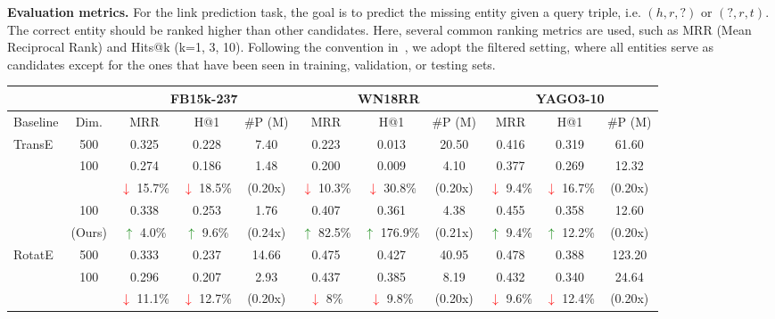 \documentclass{article}
\begin{document}
{\bf Evaluation metrics.} For the link prediction task, the goal is to
predict the missing entity given a query triple, i.e. $(h, r, ?)$ or
$(?, r, t)$. The correct entity should be ranked higher than other
candidates. Here, several common ranking metrics are used, such as MRR
(Mean Reciprocal Rank) and Hits@k (k=1, 3, 10). Following the convention
in~\citet{bordes2013translating}, we adopt the filtered setting, where
all entities serve as candidates except for the ones that have been seen
in training, validation, or testing sets.

\begin{table*}[!t]
\setlength\tabcolsep{3pt}
\centering
\begin{tabular}{l|c | ccc | ccc | ccc}
\hline
&
& \multicolumn{3}{c|}{\textbf{FB15k-237}} 
& \multicolumn{3}{c|}{\textbf{WN18RR}}
& \multicolumn{3}{c}{\textbf{YAGO3-10}} \\
\hline
Baseline & Dim. & MRR & H@1 & \#P (M) 
& MRR & H@1 & \#P (M) 
& MRR & H@1 & \#P (M) \\
\hline 
\multirow{5}{*}{TransE} &
500
& 0.325 & 0.228 & 7.40 
& 0.223 & 0.013 & 20.50
& 0.416 & 0.319 & 61.60 \\

\cline{2-11}

&\multirow{2}{*}{100} 
& 0.274 & 0.186 & 1.48 
& 0.200 & 0.009 & 4.10
& 0.377 & 0.269 & 12.32 \\
&& \textcolor{red}{$\downarrow$} 15.7\% & \textcolor{red}{$\downarrow$} 18.5\% & (0.20x) 
& \textcolor{red}{$\downarrow$} 10.3\% & \textcolor{red}{$\downarrow$} 30.8\% & (0.20x) 
& \textcolor{red}{$\downarrow$} 9.4\% & \textcolor{red}{$\downarrow$} 16.7\% & (0.20x) \\

\cline{2-11}

& 100
& 0.338 & 0.253 & 1.76 
& 0.407 & 0.361 & 4.38 
& 0.455 & 0.358 & 12.60 \\
& (Ours)
& \textcolor{green}{$\uparrow$} 4.0\% & \textcolor{green}{$\uparrow$} 9.6\% & (0.24x)
& \textcolor{green}{$\uparrow$} 82.5\% & \textcolor{green}{$\uparrow$} 176.9\% & (0.21x) 
& \textcolor{green}{$\uparrow$} 9.4\% & \textcolor{green}{$\uparrow$} 12.2\% & (0.20x) \\
\hline\hline

\multirow{5}{*}{RotatE} &
500
& 0.333 & 0.237 & 14.66 
& 0.475 & 0.427 & 40.95
& 0.478 & 0.388 & 123.20 \\

\cline{2-11}

&\multirow{2}{*}{100} 
& 0.296 & 0.207 & 2.93 
& 0.437 & 0.385 & 8.19
& 0.432 & 0.340 & 24.64 \\
&& \textcolor{red}{$\downarrow$} 11.1\% & \textcolor{red}{$\downarrow$} 12.7\% & (0.20x)
& \textcolor{red}{$\downarrow$} 8\% & \textcolor{red}{$\downarrow$} 9.8\% & (0.20x)
& \textcolor{red}{$\downarrow$} 9.6\% & \textcolor{red}{$\downarrow$} 12.4\% & (0.20x) \\


\end{tabular}
\end{table*}
\end{document}
